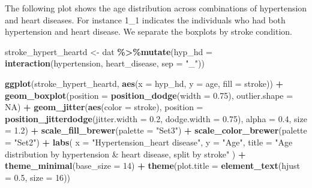 \documentclass[
]{article}
\newenvironment{Shaded}{\begin{snugshade}}{\end{snugshade}}
\newcommand{\AttributeTok}[1]{\textcolor[rgb]{0.13,0.29,0.53}{#1}}
\newcommand{\ConstantTok}[1]{\textcolor[rgb]{0.56,0.35,0.01}{#1}}
\newcommand{\DecValTok}[1]{\textcolor[rgb]{0.00,0.00,0.81}{#1}}
\newcommand{\FloatTok}[1]{\textcolor[rgb]{0.00,0.00,0.81}{#1}}
\newcommand{\FunctionTok}[1]{\textcolor[rgb]{0.13,0.29,0.53}{\textbf{#1}}}
\newcommand{\NormalTok}[1]{#1}
\newcommand{\OtherTok}[1]{\textcolor[rgb]{0.56,0.35,0.01}{#1}}
\newcommand{\SpecialCharTok}[1]{\textcolor[rgb]{0.81,0.36,0.00}{\textbf{#1}}}
\newcommand{\StringTok}[1]{\textcolor[rgb]{0.31,0.60,0.02}{#1}}
\begin{document}
The following plot shows the age distribution across combinations of
hypertension and heart diseases. For instance 1\_1 indicates the
individuals who had both hypertension and heart disease. We separate the
boxplots by stroke condition.

\begin{Shaded}
\begin{Highlighting}[]
\NormalTok{stroke\_hypert\_heartd }\OtherTok{\textless{}{-}}\NormalTok{ dat }\SpecialCharTok{\%\textgreater{}\%}\FunctionTok{mutate}\NormalTok{(}\AttributeTok{hyp\_hd =} \FunctionTok{interaction}\NormalTok{(hypertension, heart\_disease, }\AttributeTok{sep =} \StringTok{"\_"}\NormalTok{))}

\FunctionTok{ggplot}\NormalTok{(stroke\_hypert\_heartd, }\FunctionTok{aes}\NormalTok{(}\AttributeTok{x =}\NormalTok{ hyp\_hd, }\AttributeTok{y =}\NormalTok{ age, }\AttributeTok{fill =}\NormalTok{ stroke)) }\SpecialCharTok{+}
    \FunctionTok{geom\_boxplot}\NormalTok{(}\AttributeTok{position =} \FunctionTok{position\_dodge}\NormalTok{(}\AttributeTok{width =} \FloatTok{0.75}\NormalTok{), }\AttributeTok{outlier.shape =} \ConstantTok{NA}\NormalTok{) }\SpecialCharTok{+}
    \FunctionTok{geom\_jitter}\NormalTok{(}\FunctionTok{aes}\NormalTok{(}\AttributeTok{color =}\NormalTok{ stroke),  }
                \AttributeTok{position =} \FunctionTok{position\_jitterdodge}\NormalTok{(}\AttributeTok{jitter.width =} \FloatTok{0.2}\NormalTok{, }\AttributeTok{dodge.width =} \FloatTok{0.75}\NormalTok{),}
                \AttributeTok{alpha =} \FloatTok{0.4}\NormalTok{, }\AttributeTok{size =} \FloatTok{1.2}\NormalTok{) }\SpecialCharTok{+}
    \FunctionTok{scale\_fill\_brewer}\NormalTok{(}\AttributeTok{palette =} \StringTok{"Set3"}\NormalTok{) }\SpecialCharTok{+}
    \FunctionTok{scale\_color\_brewer}\NormalTok{(}\AttributeTok{palette =} \StringTok{"Set2"}\NormalTok{) }\SpecialCharTok{+}
    \FunctionTok{labs}\NormalTok{(}
      \AttributeTok{x =} \StringTok{"Hypertension\_heart disease"}\NormalTok{,}
      \AttributeTok{y =} \StringTok{"Age"}\NormalTok{,}
      \AttributeTok{title =} \StringTok{"Age distribution by hypertension \& heart disease, split by stroke"}
\NormalTok{    ) }\SpecialCharTok{+}
    \FunctionTok{theme\_minimal}\NormalTok{(}\AttributeTok{base\_size =} \DecValTok{14}\NormalTok{) }\SpecialCharTok{+}
    \FunctionTok{theme}\NormalTok{(}\AttributeTok{plot.title =} \FunctionTok{element\_text}\NormalTok{(}\AttributeTok{hjust =} \FloatTok{0.5}\NormalTok{, }\AttributeTok{size =} \DecValTok{16}\NormalTok{))}
\end{Highlighting}
\end{Shaded}
\end{document}
